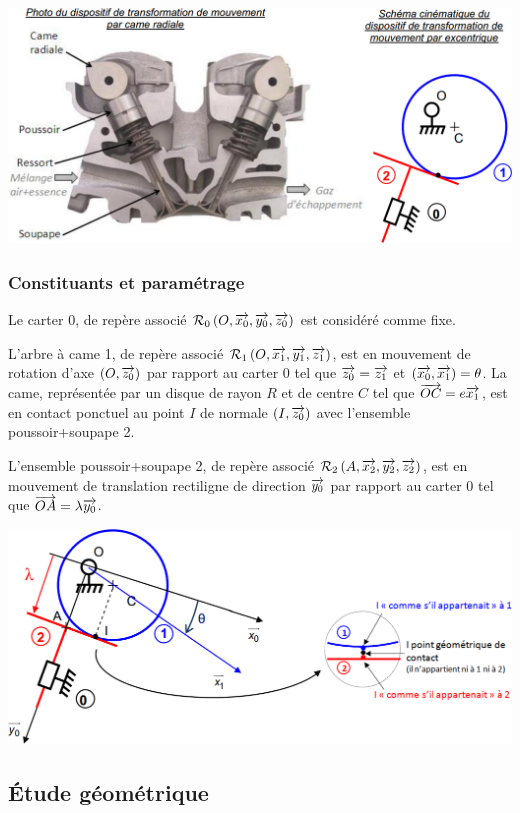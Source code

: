 \documentclass[10pt]{article}
\begin{document}
\begin{center}
\includegraphics[width=.8\textwidth]{images/fig_02}
\end{center}
\subsubsection*{Constituants et paramétrage}
Le carter 0, de repère associé $\mathcal{R}_0\left( O,\overrightarrow{x_0},\overrightarrow{y_0},\overrightarrow{z_0}\right)$ est considéré comme fixe. 

L’arbre à came 1, de repère associé 
$\mathcal{R}_1\left( O,\overrightarrow{x_1},\overrightarrow{y_1},\overrightarrow{z_1}\right)$, est en mouvement de rotation d’axe $\left(O,\overrightarrow{z_0} \right)$ par rapport au carter 0 tel que $\overrightarrow{z_0}=\overrightarrow{z_1}$ et 
$\left(\overrightarrow{x_0},\overrightarrow{x_1}\right)=\theta$. La came, représentée par un disque de rayon $R$ et de centre $C$ tel que $\overrightarrow{OC}=e\overrightarrow{x_1}$, est en contact ponctuel au point $I$ de normale $(I,\overrightarrow{z_0})$ avec l’ensemble poussoir+soupape 2. 

L’ensemble poussoir+soupape 2, de repère associé $\mathcal{R}_2\left( A,\overrightarrow{x_2},\overrightarrow{y_2},\overrightarrow{z_2}\right)$, est en mouvement de translation rectiligne de direction 
$\overrightarrow{y_0}$ par rapport au carter 0 tel que $\overrightarrow{OA}=\lambda \overrightarrow{y_0}$.



\begin{center}
\includegraphics[width=.8\textwidth]{images/fig_03}
\end{center}

\subsection*{Étude géométrique}
\end{document}
